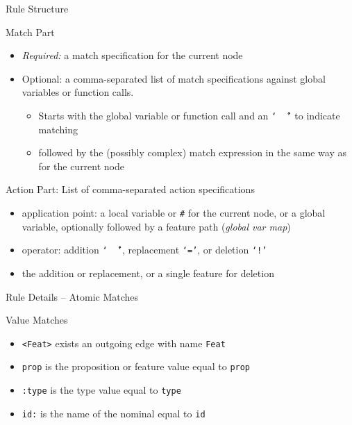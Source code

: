\documentclass{beamer}
\begin{document}
\begin{frame}{Rule Structure}

  \begin{block}{Match Part}
    \begin{itemize}
    \item \emph{Required:} a match specification for the current node
    \item Optional: a comma-separated list of match specifications against
      global variables or function calls.
      \begin{itemize}
      \item Starts with the global variable or function call and an
        \texttt{`\,\^\,'} to indicate matching
      \item followed by the (possibly complex) match expression in the same way
        as for the current node
      \end{itemize}
    \end{itemize}
  \end{block}
  \begin{block}{Action Part: List of comma-separated action specifications}
    \begin{itemize}
    \item application point: a local variable or \texttt{\#} for the current
      node, or a global variable, optionally followed by a feature path
      (\emph{global var map})
    \item operator: addition \texttt{`\,\^\,'}, replacement
      \texttt{`='}, or deletion \texttt{`!'}
    \item the addition or replacement, or a single feature for deletion
    \end{itemize}
  \end{block}
\end{frame}


\begin{frame}{Rule Details -- Atomic Matches}
  \begin{block}{Value Matches}
    \begin{itemize}
    \item \texttt{<Feat>} exists an outgoing edge with name \texttt{Feat}
    \item \texttt{prop} is the proposition or feature value equal to
      \texttt{prop}
    \item \texttt{:type} is the type value equal to \texttt{type}
    \item \texttt{id:} is the name of the nominal equal to \texttt{id}
    \end{itemize}
  \end{block}
\end{frame}
\end{document}
